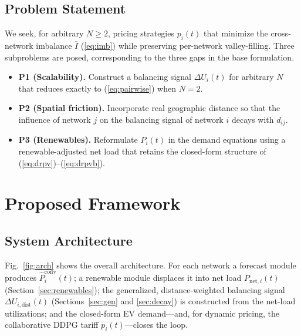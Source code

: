 \documentclass[10pt,journal]{IEEEtran}
\newcommand{\D}{\Delta}
\begin{document}
\subsection{Problem Statement}
We seek, for arbitrary $N\ge2$, pricing strategies $p_i(t)$ that minimize
the cross-network imbalance $\bar I$ (\ref{eq:imb}) while preserving per-network
valley-filling. Three subproblems are posed, corresponding to the three
gaps in the base formulation.
\begin{itemize}
  \item \textbf{P1 (Scalability).} Construct a balancing signal
        $\D U_i(t)$ for arbitrary $N$ that reduces exactly to
        (\ref{eq:pairwise}) when $N{=}2$.
  \item \textbf{P2 (Spatial friction).} Incorporate real geographic
        distance so that the influence of network $j$ on the balancing
        signal of network $i$ decays with $d_{ij}$.
  \item \textbf{P3 (Renewables).} Reformulate $P_i(t)$ in the demand
        equations using a renewable-adjusted net load that retains the
        closed-form structure of (\ref{eq:drpv})--(\ref{eq:drpvb}).
\end{itemize}

\section{Proposed Framework}\label{sec:framework}

\subsection{System Architecture}
Fig.~\ref{fig:arch} shows the overall architecture. For each network a
forecast module produces $\hat P_i^{\mathrm{conv}}(t)$; a renewable module
displaces it into net load $P_{\mathrm{net},i}(t)$
(Section~\ref{sec:renewables}); the generalized, distance-weighted
balancing signal $\D U_{i,\mathrm{dist}}(t)$ (Sections~\ref{sec:gen} and
\ref{sec:decay}) is constructed from the net-load utilizations; and the
closed-form EV demand---and, for dynamic pricing, the collaborative DDPG
tariff $p_i(t)$---closes the loop.
\end{document}
